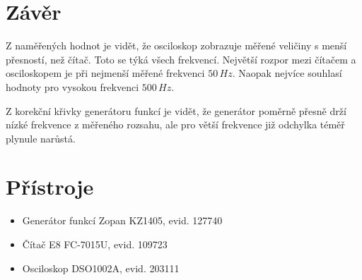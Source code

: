 \documentclass[12pt]{article} %
\begin{document}
\section{Závěr}
Z naměřených hodnot je vidět, že osciloskop zobrazuje měřené veličiny s menší přesností, než čítač. Toto se týká všech frekvencí. Největší rozpor mezi čítačem a osciloskopem je při nejmenší měřené frekvenci $50\,Hz$. Naopak nejvíce souhlasí hodnoty pro vysokou frekvenci $500\,Hz$.

Z korekční křivky generátoru funkcí je vidět, že generátor poměrně přesně drží nízké frekvence z měřeného rozsahu, ale pro větší frekvence již odchylka téměř plynule narůstá.

\section{Přístroje}
\begin{itemize}
\item Generátor funkcí Zopan KZ1405, evid. 127740
\item Čítač E8 FC-7015U, evid. 109723
\item Osciloskop DSO1002A, evid. 203111
\end{itemize}
\end{document}
